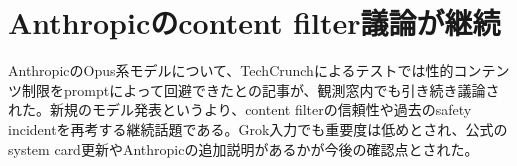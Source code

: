 \section{Anthropicのcontent filter議論が継続}
AnthropicのOpus系モデルについて、TechCrunchによるテストでは性的コンテンツ制限をpromptによって回避できたとの記事が、観測窓内でも引き続き議論された。新規のモデル発表というより、content filterの信頼性や過去のsafety incidentを再考する継続話題である。Grok入力でも重要度は低めとされ、公式のsystem card更新やAnthropicの追加説明があるかが今後の確認点とされた。
